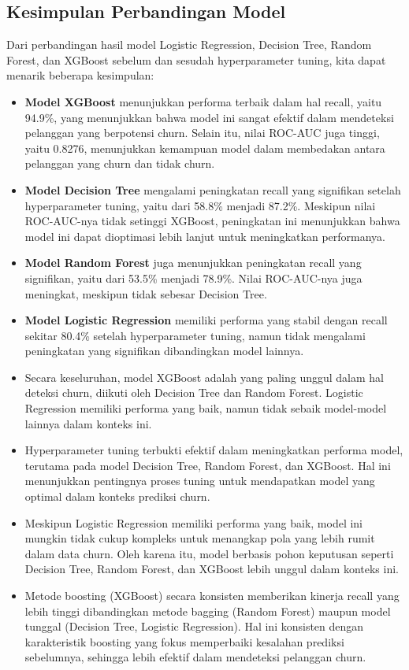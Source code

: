 \subsection{Kesimpulan Perbandingan Model}
Dari perbandingan hasil model Logistic Regression, Decision Tree, Random Forest, dan XGBoost sebelum dan sesudah hyperparameter tuning, kita dapat menarik beberapa kesimpulan:
\begin{itemize}
    \item \textbf{Model XGBoost} menunjukkan performa terbaik dalam hal recall, yaitu 94.9\%, yang menunjukkan bahwa model ini sangat efektif dalam mendeteksi pelanggan yang berpotensi churn. Selain itu, nilai ROC-AUC juga tinggi, yaitu 0.8276, menunjukkan kemampuan model dalam membedakan antara pelanggan yang churn dan tidak churn.
    \item \textbf{Model Decision Tree} mengalami peningkatan recall yang signifikan setelah hyperparameter tuning, yaitu dari 58.8\% menjadi 87.2\%. Meskipun nilai ROC-AUC-nya tidak setinggi XGBoost, peningkatan ini menunjukkan bahwa model ini dapat dioptimasi lebih lanjut untuk meningkatkan performanya.
    \item \textbf{Model Random Forest} juga menunjukkan peningkatan recall yang signifikan, yaitu dari 53.5\% menjadi 78.9\%. Nilai ROC-AUC-nya juga meningkat, meskipun tidak sebesar Decision Tree.
    \item \textbf{Model Logistic Regression} memiliki performa yang stabil dengan recall sekitar 80.4\% setelah hyperparameter tuning, namun tidak mengalami peningkatan yang signifikan dibandingkan model lainnya.
    \item Secara keseluruhan, model XGBoost adalah yang paling unggul dalam hal deteksi churn, diikuti oleh Decision Tree dan Random Forest. Logistic Regression memiliki performa yang baik, namun tidak sebaik model-model lainnya dalam konteks ini.
    \item Hyperparameter tuning terbukti efektif dalam meningkatkan performa model, terutama pada model Decision Tree, Random Forest, dan XGBoost. Hal ini menunjukkan pentingnya proses tuning untuk mendapatkan model yang optimal dalam konteks prediksi churn.
    \item Meskipun Logistic Regression memiliki performa yang baik, model ini mungkin tidak cukup kompleks untuk menangkap pola yang lebih rumit dalam data churn. Oleh karena itu, model berbasis pohon keputusan seperti Decision Tree, Random Forest, dan XGBoost lebih unggul dalam konteks ini.
    \item Metode boosting (XGBoost) secara konsisten memberikan kinerja recall yang lebih tinggi dibandingkan metode bagging (Random Forest) maupun model tunggal (Decision Tree, Logistic Regression). Hal ini konsisten dengan karakteristik boosting yang fokus memperbaiki kesalahan prediksi sebelumnya, sehingga lebih efektif dalam mendeteksi pelanggan churn.
\end{itemize}

